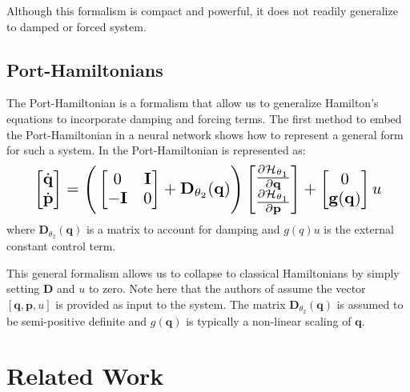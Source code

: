 \documentclass[twoside]{article}
\begin{document}
Although this formalism is compact and powerful, it does not readily generalize to damped or forced system.

\subsection{Port-Hamiltonians}

The Port-Hamiltonian is a formalism that allow us to generalize Hamilton's equations to incorporate damping and forcing terms. The first method to embed the Port-Hamiltonian in a neural network \cite{zhong_dissipative_2020} shows how to represent a general form for such a system. In \cite{zhong_dissipative_2020} the Port-Hamiltonian is represented as:
\begin{equation}
\resizebox{0.9\linewidth}{!}{$%
\begin{bmatrix}
\dot{\mathbf{q}} \\
\dot{\mathbf{p}}
\end{bmatrix}
=
\Bigg(\begin{bmatrix}
0 & \mathbf{I} \\
-\mathbf{I} & 0
\end{bmatrix} +
\mathbf{D}_{\theta_2}(\mathbf{q})
 \Bigg)
 \begin{bmatrix}
\frac{\partial \mathcal{H}_{\theta_1}}{\partial \mathbf{q}} \\
\frac{\partial \mathcal{H}_{\theta_1}}{\partial \mathbf{p}}
\end{bmatrix}
+
\begin{bmatrix}
0 \\
\mathbf{g}(\mathbf{q})
\end{bmatrix}
u
$%
}%
\label{eqn.pham}
\end{equation}
where $\mathbf{D}_{\theta_2}(\mathbf{q})$ is a matrix to account for damping and $g(q)u$ is the external constant control term. 

This general formalism allows us to collapse to classical Hamiltonians by simply setting $\mathbf{D}$ and $u$ to zero. Note here that the authors of \cite{zhong_dissipative_2020} assume the vector $[\mathbf{q},\mathbf{p},u]$ is provided as input to the system. The matrix $\mathbf{D}_{\theta_2}(\mathbf{q})$ is assumed to be semi-positive definite and $g(\mathbf{q})$ is typically a non-linear scaling of $\mathbf{q}$.

\section{Related Work}
\end{document}
